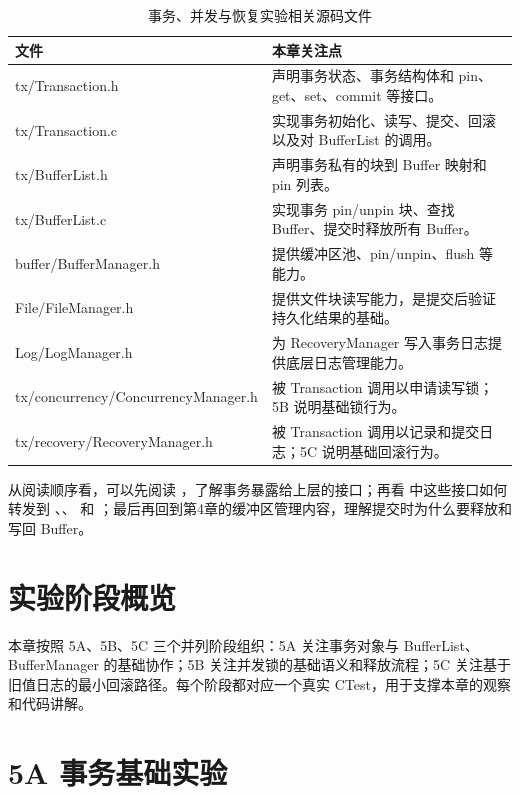 \begin{table}[htbp]
  \centering
  \caption{事务、并发与恢复实验相关源码文件}
  \label{tab:tx-source-files}
  \begin{tabularx}{\textwidth}{>{\ttfamily}l Y}
    \toprule
    文件 & 本章关注点 \\
    \midrule
    tx/Transaction.h & 声明事务状态、事务结构体和 pin、get、set、commit 等接口。\\
    tx/Transaction.c & 实现事务初始化、读写、提交、回滚以及对 BufferList 的调用。\\
    tx/BufferList.h & 声明事务私有的块到 Buffer 映射和 pin 列表。\\
    tx/BufferList.c & 实现事务 pin/unpin 块、查找 Buffer、提交时释放所有 Buffer。\\
    buffer/BufferManager.h & 提供缓冲区池、pin/unpin、flush 等能力。\\
    File/FileManager.h & 提供文件块读写能力，是提交后验证持久化结果的基础。\\
    Log/LogManager.h & 为 RecoveryManager 写入事务日志提供底层日志管理能力。\\
    tx/concurrency/ConcurrencyManager.h & 被 Transaction 调用以申请读写锁；5B 说明基础锁行为。\\
    tx/recovery/RecoveryManager.h & 被 Transaction 调用以记录和提交日志；5C 说明基础回滚行为。\\
    \bottomrule
  \end{tabularx}
\end{table}

从阅读顺序看，可以先阅读 ，了解事务暴露给上层的接口；再看  中这些接口如何转发到 、、 和 ；最后再回到第4章的缓冲区管理内容，理解提交时为什么要释放和写回 Buffer。

\section{实验阶段概览}
\label{sec:tx-stage-overview}

本章按照 5A、5B、5C 三个并列阶段组织：5A 关注事务对象与 BufferList、BufferManager 的基础协作；5B 关注并发锁的基础语义和释放流程；5C 关注基于旧值日志的最小回滚路径。每个阶段都对应一个真实 CTest，用于支撑本章的观察和代码讲解。

\section{5A 事务基础实验}
\label{sec:tx-basic}

